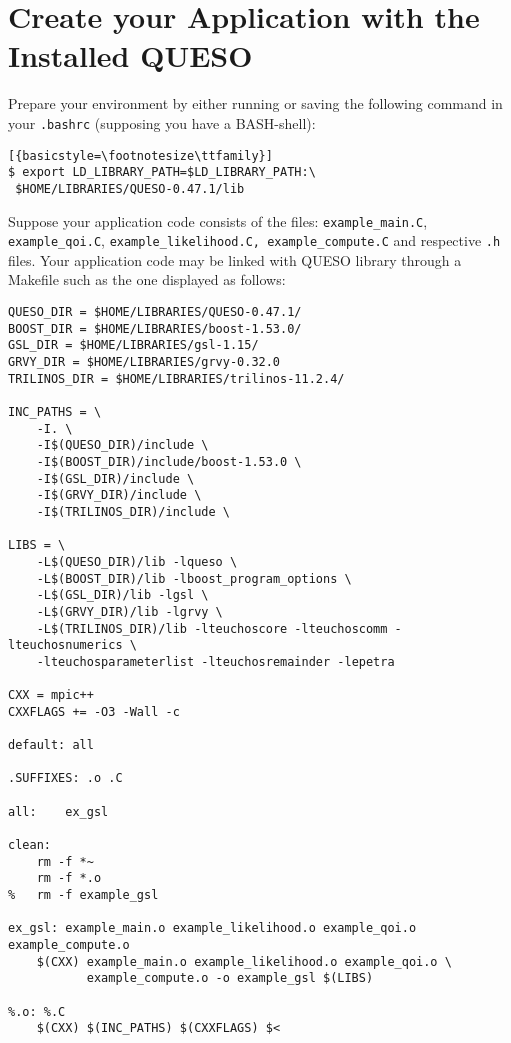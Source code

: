 \section{Create your Application with the Installed QUESO} \label{sc-use-queso}

Prepare your environment by either running or saving the following command in
your \verb+.bashrc+ (supposing you have a BASH-shell):
\begin{lstlisting}[{basicstyle=\footnotesize\ttfamily}]
$ export LD_LIBRARY_PATH=$LD_LIBRARY_PATH:\
 $HOME/LIBRARIES/QUESO-0.47.1/lib
\end{lstlisting}



Suppose your application code consists of the files:  \verb+example_main.C+,
\verb+example_qoi.C+,  \verb+example_likelihood.C, example_compute.C+ and
respective \verb+.h+ files. Your application code may be linked with QUESO
library through a Makefile such as the one displayed as follows:

\begin{lstlisting}[basicstyle={\footnotesize\ttfamily},deletekeywords={export,rm}]
QUESO_DIR = $HOME/LIBRARIES/QUESO-0.47.1/
BOOST_DIR = $HOME/LIBRARIES/boost-1.53.0/
GSL_DIR = $HOME/LIBRARIES/gsl-1.15/
GRVY_DIR = $HOME/LIBRARIES/grvy-0.32.0
TRILINOS_DIR = $HOME/LIBRARIES/trilinos-11.2.4/

INC_PATHS = \
	-I. \
	-I$(QUESO_DIR)/include \
	-I$(BOOST_DIR)/include/boost-1.53.0 \
	-I$(GSL_DIR)/include \
	-I$(GRVY_DIR)/include \
	-I$(TRILINOS_DIR)/include \

LIBS = \
	-L$(QUESO_DIR)/lib -lqueso \
	-L$(BOOST_DIR)/lib -lboost_program_options \
	-L$(GSL_DIR)/lib -lgsl \
	-L$(GRVY_DIR)/lib -lgrvy \
	-L$(TRILINOS_DIR)/lib -lteuchoscore -lteuchoscomm -lteuchosnumerics \
	-lteuchosparameterlist -lteuchosremainder -lepetra

CXX = mpic++
CXXFLAGS += -O3 -Wall -c

default: all

.SUFFIXES: .o .C

all:	ex_gsl

clean:
	rm -f *~
	rm -f *.o
% 	rm -f example_gsl

ex_gsl: example_main.o example_likelihood.o example_qoi.o example_compute.o
	$(CXX) example_main.o example_likelihood.o example_qoi.o \
	       example_compute.o -o example_gsl $(LIBS)

%.o: %.C
	$(CXX) $(INC_PATHS) $(CXXFLAGS) $<
\end{lstlisting}
% 

